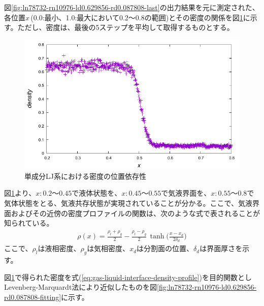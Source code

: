 \documentclass[titlepage]{jsreport}
\begin{document}
図\ref{fig:ln78732-rn10976-ld0.629856-rd0.087808-last}の出力結果を元に測定された、各位置$x$\,(0.0:最小、1.0:最大において0.2〜0.8の範囲)とその密度の関係を図\ref{fig:ln78732-rn10976-ld0.629856-rd0.087808}に示す。ただし、密度は、最後の5ステップを平均して取得するものとする。

\begin{figure}[htbp]
    \begin{center}
        \includegraphics[width=14cm]{fig/ln78732-rn10976-ld0.629856-rd0.087808/ln78732-rn10976-ld0.629856-rd0.087808.pdf}
    \end{center}
    \caption{単成分LJ系における密度の位置依存性}
    \label{fig:ln78732-rn10976-ld0.629856-rd0.087808}
\end{figure}

\newpage
図\ref{fig:ln78732-rn10976-ld0.629856-rd0.087808}より、$x:0.2〜0.45$で液体状態を、$x:0.45〜0.55$で気液界面を、$x:0.55〜0.8$で気体状態をとる、気液共存状態が実現されていることが分かる。ここで、気液界面およびその近傍の密度プロファイルの関数は、次のような式で表されることが知られている\cite{gas-liquid-interface-density-profile}。
\large
\begin{eqnarray}
    \rho(x) = \frac{\rho_l+\rho_g}{2} - \frac{\rho_l-\rho_g}{2}\,\tanh\Bigg(\frac{x-x_d}{2\delta_d}\Bigg) \label{eq:gas-liquid-interface-density-profile}
\end{eqnarray}
\normalsize
ここで、$\rho_l$は液相密度、$\rho_g$は気相密度、$x_d$は分割面の位置、$\delta_d$は界面厚さを示す。

図\ref{fig:ln78732-rn10976-ld0.629856-rd0.087808}で得られた密度を式(\ref{eq:gas-liquid-interface-density-profile})を目的関数としLevenberg-Marquardt法により近似したものを図\ref{fig:ln78732-rn10976-ld0.629856-rd0.087808-fitting}に示す。
\end{document}
